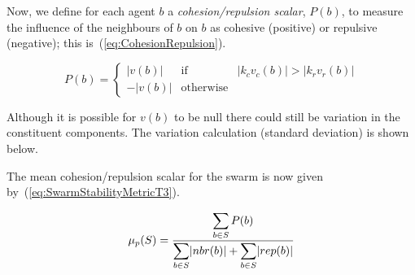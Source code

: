\documentclass{ieeeaccess}
\begin{document}
Now, we define for each agent $b$ a \emph{cohesion/repulsion scalar}, $P(b)$, to measure the influence of the neighbours of $b$ on $b$ as cohesive (positive) or repulsive (negative); this is~(\ref{eq:CohesionRepulsion}).

\begin{equation}
\label{eq:CohesionRepulsion}
P(b) = \left\{\begin{array}{lll}
               |v(b)|& \mathrm{if} & |k_cv_c(b)| > |k_r v_r(b)|\\
              -|v(b)|& \mathrm{otherwise}
              \end{array}\right.
\end{equation}

Although it is possible for $v(b)$ to be null there could still be variation in the constituent components. The variation calculation (standard deviation) is shown below. 



The mean cohesion/repulsion scalar for the swarm is now given by~(\ref{eq:SwarmStabilityMetricT3}).  

\begin{equation}
\label{eq:SwarmStabilityMetricT3}
\mu_p(S) = \frac{\mathlarger{\sum_{b \in S} P(b)}}{\mathlarger{\sum_{b \in S}}|nbr(b)| + \mathlarger{\sum_{b \in S}}|rep(b)|}
\end{equation}

\end{document}
